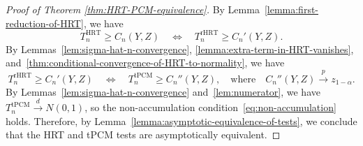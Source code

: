 \documentclass[12pt]{article}
\theoremstyle{definition}
\theoremstyle{remark}
\newcommand{\convp}{\overset p \rightarrow}             %
\newcommand{\convd}{\overset d \rightarrow}             %
\newcommand{\srz}{Z}									%
\newcommand{\sry}{Y}									%
\begin{document}
\begin{proof}[Proof of Theorem \ref{thm:HRT-PCM-equivalence}]
By Lemma~\ref{lemma:first-reduction-of-HRT}, we have
\begin{equation}
T^{\text{HRT}}_n \geq C_n(\sry, \srz) \quad \Longleftrightarrow \quad T^{\text{rHRT}}_n \geq C_n'(\sry, \srz).
\end{equation}
By Lemmas~\ref{lem:sigma-hat-n-convergence}, \ref{lemma:extra-term-in-HRT-vanishes}, and~\ref{thm:conditional-convergence-of-HRT-to-normality}, we have
\begin{equation}
T^{\text{rHRT}}_n \geq C_n'(\sry, \srz) \quad \Longleftrightarrow \quad T^{\text{tPCM}}_n \geq C_n''(\sry, \srz), \quad \text{where} \quad C_n''(\sry, \srz) \convp z_{1-\alpha}.
\end{equation}
By Lemmas~\ref{lem:sigma-hat-n-convergence} and~\ref{lem:numerator}, we have $T^{\text{tPCM}}_n \convd N(0,1)$, so the non-accumulation condition~\eqref{eq:non-accumulation} holds. Therefore, by Lemma~\ref{lemma:asymptotic-equivalence-of-tests}, we conclude that the HRT and tPCM tests are asymptotically equivalent.
\end{proof}
\end{document}
